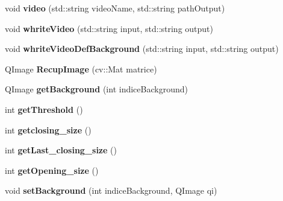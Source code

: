 \begin{DoxyCompactItemize}
\item 
\hypertarget{classMagicfish_a00ceb1c3e41cbae30ea3127e40742867}{void {\bfseries video} (std\-::string video\-Name, std\-::string path\-Output)}\label{classMagicfish_a00ceb1c3e41cbae30ea3127e40742867}

\item 
\hypertarget{classMagicfish_a622cabef45a1b89a1dc0d721c1f6ce9c}{void {\bfseries whrite\-Video} (std\-::string input, std\-::string output)}\label{classMagicfish_a622cabef45a1b89a1dc0d721c1f6ce9c}

\item 
\hypertarget{classMagicfish_aab353650bd7bedd593a7101770ee102d}{void {\bfseries whrite\-Video\-Def\-Background} (std\-::string input, std\-::string output)}\label{classMagicfish_aab353650bd7bedd593a7101770ee102d}

\item 
\hypertarget{classMagicfish_ab6701d65cbd335d58c7436991230ae35}{Q\-Image {\bfseries Recup\-Image} (cv\-::\-Mat matrice)}\label{classMagicfish_ab6701d65cbd335d58c7436991230ae35}

\item 
\hypertarget{classMagicfish_aacf4643de36b5ca777439b2682eb73f3}{Q\-Image {\bfseries get\-Background} (int indice\-Background)}\label{classMagicfish_aacf4643de36b5ca777439b2682eb73f3}

\item 
\hypertarget{classMagicfish_aa5d1d72ed90f8d0585852321302dafa9}{int {\bfseries get\-Threshold} ()}\label{classMagicfish_aa5d1d72ed90f8d0585852321302dafa9}

\item 
\hypertarget{classMagicfish_aac4e17cd338db300bb71f335ce8ed11c}{int {\bfseries getclosing\-\_\-size} ()}\label{classMagicfish_aac4e17cd338db300bb71f335ce8ed11c}

\item 
\hypertarget{classMagicfish_aaeb5e0a3f4cc9f0b5965f6d474e1a2c0}{int {\bfseries get\-Last\-\_\-closing\-\_\-size} ()}\label{classMagicfish_aaeb5e0a3f4cc9f0b5965f6d474e1a2c0}

\item 
\hypertarget{classMagicfish_a0dbc287a6da6da9f46b3bf82f59cfd07}{int {\bfseries get\-Opening\-\_\-size} ()}\label{classMagicfish_a0dbc287a6da6da9f46b3bf82f59cfd07}

\item 
\hypertarget{classMagicfish_aa50681ec40c30bfe411904018672b799}{void {\bfseries set\-Background} (int indice\-Background, Q\-Image qi)}\label{classMagicfish_aa50681ec40c30bfe411904018672b799}


\end{DoxyCompactItemize}
